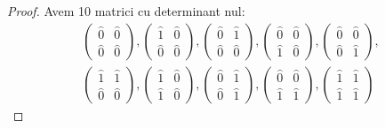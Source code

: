 \begin{exercise}[1.29]
\begin{itemize}
\begin{proof}
    Avem 10 matrici cu determinant nul:
    \begin{gather*}
        \begin{pmatrix}
            \widehat{0} & \widehat{0} \\
            \widehat{0} & \widehat{0}
        \end{pmatrix},
        \begin{pmatrix}
            \widehat{1} & \widehat{0} \\
            \widehat{0} & \widehat{0}
        \end{pmatrix},
        \begin{pmatrix}
            \widehat{0} & \widehat{1} \\
            \widehat{0} & \widehat{0}
        \end{pmatrix},
        \begin{pmatrix}
            \widehat{0} & \widehat{0} \\
            \widehat{1} & \widehat{0}
        \end{pmatrix},
        \begin{pmatrix}
            \widehat{0} & \widehat{0} \\
            \widehat{0} & \widehat{1}
        \end{pmatrix},
        \\
        \begin{pmatrix}
            \widehat{1} & \widehat{1} \\
            \widehat{0} & \widehat{0}
        \end{pmatrix},
        \begin{pmatrix}
            \widehat{1} & \widehat{0} \\
            \widehat{1} & \widehat{0}
        \end{pmatrix},
        \begin{pmatrix}
            \widehat{0} & \widehat{1} \\
            \widehat{0} & \widehat{1}
        \end{pmatrix},
        \begin{pmatrix}
            \widehat{0} & \widehat{0} \\
            \widehat{1} & \widehat{1}
        \end{pmatrix},
        \begin{pmatrix}
            \widehat{1} & \widehat{1} \\
            \widehat{1} & \widehat{1}
        \end{pmatrix}
    \end{gather*}
    \end{proof}
    

\end{itemize}
\end{exercise}
